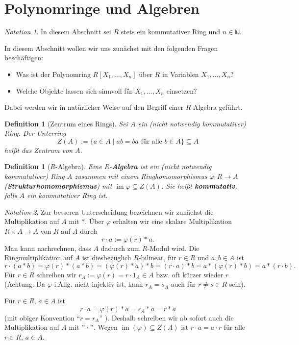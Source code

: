 \documentclass[a4paper, twoside, 11pt, ngerman]{report}
\newcommand{\NN}{\mathds N}
\theoremstyle{definistyle}
\newtheorem{defini}[satz]{Definition}
\theoremstyle{remark}
\newtheorem*{notation}{Notation}
\newcommand{\defn}[1]{\textit{\bfseries #1}}
\begin{document}
\section{Polynomringe und Algebren}

\begin{notation}
In diesem Abschnitt sei $ R $ stets ein kommutativer Ring und  $ n \in \NN $.
\end{notation}
In diesem Abschnitt wollen wir uns zunächst mit den folgenden Fragen beschäftigen:
\begin{itemize}
    \item Was ist der Polynomring $ R[X_1, \dots, X_n] $ über $ R $ in Variablen $ X_1, \dots, X_n $?
    \item Welche Objekte lassen sich sinnvoll für $ X_1, \dots, X_n $ einsetzen?
\end{itemize}
Dabei werden wir in natürlicher Weise auf den Begriff einer $R$-Algebra geführt.

\begin{defini}[Zentrum eines Rings]\label{def:zentrum}
Sei $ A $ ein (nicht notwendig kommutativer) Ring. Der Unterring
\[
Z(A) := \{ a \in A \mid ab = ba \text{ für alle } b \in A \} \subseteq A
\]
heißt das \emph{Zentrum} von $ A $.
\end{defini}

\begin{defini}[$ R $-Algebra]\label{def:r-algebra}
Eine $ R $-\defn{Algebra} ist ein (nicht notwendig kommutativer) Ring $ A $ zusammen mit einem Ringhomomorphismus $ \varphi \colon R \to A $ (\defn{Strukturhomomorphismus}) mit $ \operatorname{im} \varphi \subseteq Z(A) $. Sie heißt \defn{kommutativ}, falls $ A $ ein kommutativer Ring ist.
\end{defini}

\begin{notation}
Zur besseren Unterscheidung bezeichnen wir zunächst die Multiplikation auf $ A $ mit $ * $. Über $ \varphi $ erhalten wir eine skalare Multiplikation $ R \times A \to A $ von $ R $ auf $ A $ durch
\[
r \cdot a := \varphi(r) * a.
\]
Man kann nachrechnen, dass $ A $ dadurch zum $ R $-Modul wird. Die Ringmultiplikation auf $ A $ ist diesbezüglich $ R $-bilinear, für $r\in R$ und $a,b\in A$ ist
\[
r \cdot (a * b) = \varphi(r) * (a * b) = (\varphi(r) * a) * b = (r \cdot a) * b = a * (\varphi(r) * b) = a * (r \cdot b).
\]
Für $ r \in R $ schreiben wir $ r_A := \varphi(r) = r \cdot 1_A \in A $ bzw. oft kürzer wieder $ r $ (Achtung: Da $ \varphi $ i.Allg. nicht injektiv ist, kann $ r_A = s_A $ auch für $ r \neq s \in R $ sein).

Für $ r \in R, \, a \in A $ ist
\[
r \cdot a = \varphi(r) * a = r_A * a = r * a
\]
(mit obiger Konvention "`$r = r_A$"' ).
Deshalb schreiben wir ab sofort auch die Multiplikation auf $ A $ mit $ "\cdot" $. Wegen $ \operatorname{im}(\varphi) \subseteq Z(A) $ ist $ r \cdot a = a \cdot r $ für alle $ r \in R, \, a \in A $.
\end{notation}
\end{document}
